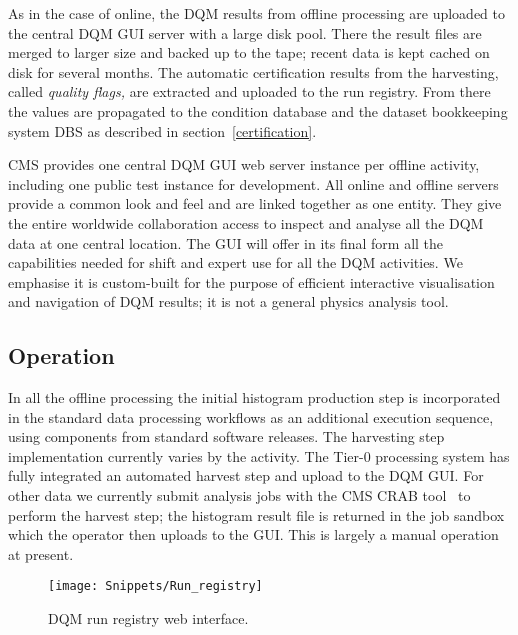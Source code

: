 \documentclass[a4paper]{jpconf}
\begin{document}
As in the case of online, the DQM results from offline processing are uploaded
to the central DQM GUI server with a large disk pool.  There the result files
are merged to larger size and backed up to the tape; recent data is kept
cached on disk for several months.  The automatic certification results from
the harvesting, called {\em quality flags,} are extracted and uploaded to the
run registry.  From there the values are propagated to the condition database
and the dataset bookkeeping system DBS as described in
section~\ref{certification}.

CMS provides one central DQM GUI web server instance per offline activity,
including one public test instance for development.  All online and offline
servers provide a common look and feel and are linked together as one entity.
They give the entire worldwide collaboration access to inspect and analyse all
the DQM data at one central location.  The GUI will offer in its final
form all the capabilities needed for shift and expert use for all the DQM
activities.  We emphasise it is custom-built for the purpose of efficient
interactive visualisation and navigation of DQM results; it is not a general
physics analysis tool.

\subsection{Operation}

In all the offline processing the initial histogram production step is
incorporated in the standard data processing workflows as an additional
execution sequence, using components from standard software releases.  The
harvesting step implementation currently varies by the activity.  The Tier-0
processing system has fully integrated an automated harvest step and upload to
the DQM GUI.  For other data we currently submit analysis jobs with the CMS
CRAB tool~\cite{cms_crab_07} to perform the harvest step; the histogram
result file is returned in the job sandbox which the operator then uploads
to the GUI.  This is largely a manual operation at present.


\begin{figure}[!tbp]
\begin{center}
\texttt{[image: Snippets/Run\_registry]}
\caption{\label{fig:runregistry}DQM run registry web interface.}
\end{center}
\end{figure}
\end{document}
